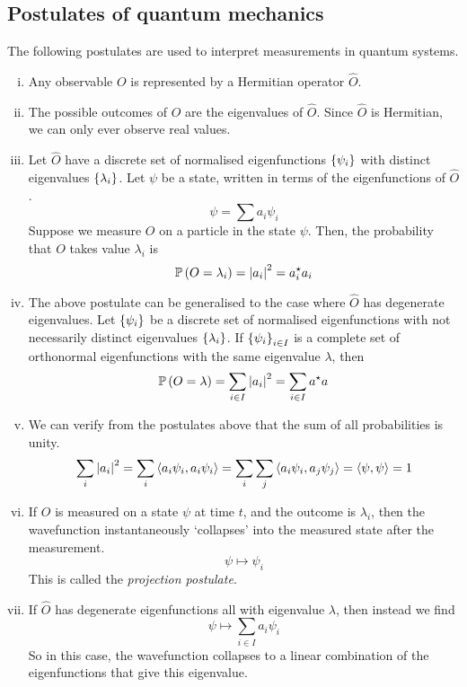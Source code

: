 \subsection{Postulates of quantum mechanics}
The following postulates are used to interpret measurements in quantum systems.
\begin{enumerate}[(i)]
	\item Any observable \( O \) is represented by a Hermitian operator \( \hat O \).
	\item The possible outcomes of \( O \) are the eigenvalues of \( \hat O \).
	      Since \( \hat O \) is Hermitian, we can only ever observe real values.
	\item Let \( \hat O \) have a discrete set of normalised eigenfunctions \( \qty{\psi_i} \) with distinct eigenvalues \( \qty{\lambda_i} \).
	      Let \( \psi \) be a state, written in terms of the eigenfunctions of \( \hat O \).
	      \[
		      \psi = \sum a_i \psi_i
	      \]
	      Suppose we measure \( O \) on a particle in the state \( \psi \).
	      Then, the probability that \( O \) takes value \( \lambda_i \) is
	      \[
		      \mathbb{P}\left({O = \lambda_i}\right) = \abs{a_i}^2 = a_i^\star a_i
	      \]
	\item The above postulate can be generalised to the case where \( \hat O \) has degenerate eigenvalues.
	      Let \( \qty{\psi_i} \) be a discrete set of normalised eigenfunctions with not necessarily distinct eigenvalues \( \qty{\lambda_i} \).
	      If \( \qty{\psi_i}_{i \in I} \) is a complete set of orthonormal eigenfunctions with the same eigenvalue \( \lambda \), then
	      \[
		      \mathbb{P}\left({O = \lambda}\right) = \sum_{i \in I} \abs{a_i}^2 = \sum_{i \in I} a^\star a
	      \]
	\item We can verify from the postulates above that the sum of all probabilities is unity.
	      \[
		      \sum_i \abs{a_i}^2 = \sum_i \left\langle{a_i \psi_i, a_i \psi_i}\right\rangle = \sum_i \sum_j \left\langle{a_i \psi_i, a_j \psi_j}\right\rangle = \left\langle{\psi, \psi}\right\rangle = 1
	      \]
	\item If \( O \) is measured on a state \( \psi \) at time \( t \), and the outcome is \( \lambda_i \), then the wavefunction instantaneously `collapses' into the measured state after the measurement.
	      \[
		      \psi \mapsto \psi_i
	      \]
	      This is called the \textit{projection postulate}.
	\item If \( \hat O \) has degenerate eigenfunctions all with eigenvalue \( \lambda \), then instead we find
	      \[
		      \psi \mapsto \sum_{i \in I} a_i \psi_i
	      \]
	      So in this case, the wavefunction collapses to a linear combination of the eigenfunctions that give this eigenvalue.
\end{enumerate}

